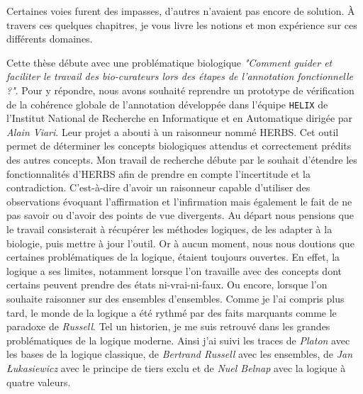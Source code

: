 \begin{refsegment}
Certaines voies furent des impasses, d'autres n'avaient pas encore de solution. À travers ces quelques chapitres, je vous livre les notions et mon expérience sur ces différents domaines.

Cette thèse débute avec une problématique biologique \textit{"Comment guider et faciliter le travail des bio-curateurs lors des étapes de l'annotation fonctionnelle ?"}. Pour y répondre, nous avons souhaité reprendre un prototype de vérification de la cohérence globale de l'annotation développée dans l'équipe \texttt{HELIX} de l'Institut National de Recherche en Informatique et en Automatique dirigée par \textit{Alain Viari}. Leur projet a abouti à un raisonneur nommé \gls{HERBS}. Cet outil permet de déterminer les concepts biologiques attendus et correctement prédits des autres concepts. Mon travail de recherche débute par le souhait d'étendre les fonctionnalités d'\gls{HERBS} afin de prendre en compte l'incertitude et la contradiction. C'est-à-dire d'avoir un raisonneur capable d'utiliser des observations évoquant l'affirmation et l'infirmation mais également le fait de ne pas savoir ou d'avoir des points de vue divergents. Au départ nous pensions que le travail consisterait à récupérer les méthodes logiques, de les adapter à la biologie, puis mettre à jour l'outil. Or à aucun moment, nous nous doutions que certaines problématiques de la logique, étaient toujours ouvertes. En effet, la logique a ses limites, notamment lorsque l'on travaille avec des concepts dont certains peuvent prendre des états ni-vrai-ni-faux. Ou encore, lorsque l'on souhaite raisonner sur des ensembles d'ensembles. Comme je l'ai compris plus tard, le monde de la logique a été rythmé par des faits marquants comme le paradoxe de \textit{Russell}. Tel un historien, je me suis retrouvé dans les grandes problématiques de la logique moderne. Ainsi j'ai suivi les traces de \textit{Platon} avec les bases de la logique classique, de \textit{Bertrand Russell} avec les ensembles, de \textit{Jan Łukasiewicz} avec le principe de tiers exclu et de \textit{Nuel Belnap} avec la logique à quatre valeurs.

\end{refsegment}
